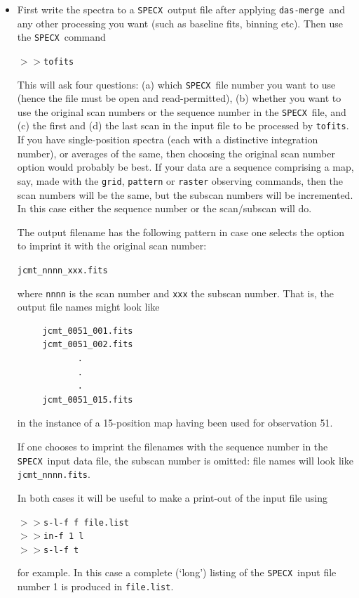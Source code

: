 \documentclass[11pt,twoside]{article}
\newcommand{\SPECX}{{\tt SPECX}}
\newcommand{\dm}{{\tt das-merge}}
\newcommand{\SP}{{$>\!>$}}
\begin{document}
\begin{itemize}
\item
First write the spectra to a \SPECX\ output file after applying \dm\
and any other processing you want (such as baseline fits, binning
etc). Then use the
\SPECX\ command 

\SP \verb|tofits|

This will ask four questions: (a) which \SPECX\ file number you want
to use (hence the file must be open and read-permitted), (b) whether
you want to use the original scan numbers or the sequence number in
the \SPECX\ file, and (c) the first and (d) the last scan in the input
file to be processed by {\tt tofits}. If you have single-position
spectra (each with a distinctive integration number), or averages of
the same, then choosing the original scan number option would
probably be best. If your data are a sequence comprising a map, say, made with
the {\tt grid}, {\tt pattern} or {\tt raster} observing commands, then
the scan numbers will be the same, but the subscan numbers will be
incremented. In this case either the sequence number or the
scan/subscan will do.

The output filename has the following pattern in case one selects the
option to imprint it with the original scan number:

\verb|jcmt_nnnn_xxx.fits|

where {\tt nnnn} is the scan number and {\tt xxx} the subscan
number. That is, the output file names might look like
\begin{verbatim}
     jcmt_0051_001.fits
     jcmt_0051_002.fits
            .
            .
            .
     jcmt_0051_015.fits
\end{verbatim}
in the instance of a 15-position map having been used for observation
51.

If one chooses to imprint the filenames with the sequence number in
the \SPECX\ input data file, the subscan number is omitted: file names
will look like
\verb|jcmt_nnnn.fits|. 

In both cases it will be useful to make a print-out of the input file
using

\SP \verb|s-l-f f file.list|\\
\SP \verb|in-f 1 l|\\
\SP \verb|s-l-f t|

for example. In this case a complete (`long') listing of the \SPECX\
input file number 1 is produced in {\tt file.list}.


\end{itemize}
\end{document}
